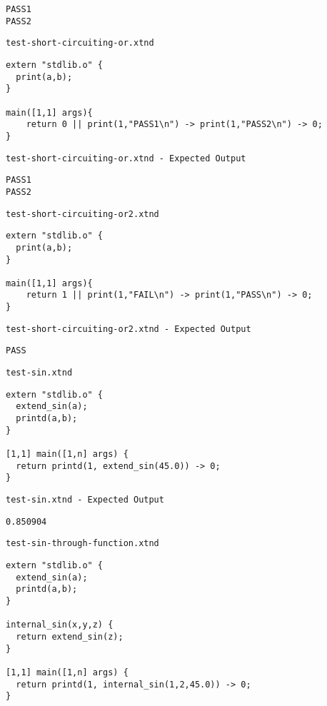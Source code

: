 \begin{lstlisting}
PASS1
PASS2
\end{lstlisting}


\medskip \noindent \texttt{test-short-circuiting-or.xtnd}


\begin{lstlisting}
extern "stdlib.o" {
  print(a,b);
}

main([1,1] args){
	return 0 || print(1,"PASS1\n") -> print(1,"PASS2\n") -> 0;
}
\end{lstlisting}


\medskip \noindent \texttt{test-short-circuiting-or.xtnd - Expected Output}


\begin{lstlisting}
PASS1
PASS2
\end{lstlisting}


\medskip \noindent \texttt{test-short-circuiting-or2.xtnd}


\begin{lstlisting}
extern "stdlib.o" {
  print(a,b);
}

main([1,1] args){
	return 1 || print(1,"FAIL\n") -> print(1,"PASS\n") -> 0;
}
\end{lstlisting}


\medskip \noindent \texttt{test-short-circuiting-or2.xtnd - Expected Output}


\begin{lstlisting}
PASS
\end{lstlisting}


\medskip \noindent \texttt{test-sin.xtnd}


\begin{lstlisting}
extern "stdlib.o" {
  extend_sin(a);
  printd(a,b);
}

[1,1] main([1,n] args) {
  return printd(1, extend_sin(45.0)) -> 0;
}
\end{lstlisting}


\medskip \noindent \texttt{test-sin.xtnd - Expected Output}


\begin{lstlisting}
0.850904
\end{lstlisting}


\medskip \noindent \texttt{test-sin-through-function.xtnd}


\begin{lstlisting}
extern "stdlib.o" {
  extend_sin(a);
  printd(a,b);
}

internal_sin(x,y,z) {
  return extend_sin(z);
}

[1,1] main([1,n] args) {
  return printd(1, internal_sin(1,2,45.0)) -> 0;
}
\end{lstlisting}


